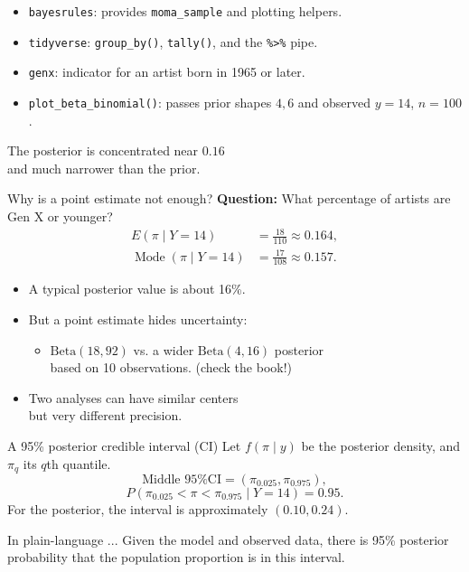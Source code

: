 \documentclass[aspectratio=43]{beamer}
\begin{document}
\begin{frame}{}
\begin{itemize}
\item \texttt{bayesrules}: provides \texttt{moma\_sample} and plotting helpers.
\item \texttt{tidyverse}: \texttt{group\_by()}, \texttt{tally()}, and the \texttt{\%>\%} pipe.
\item \texttt{genx}: indicator for an artist born in 1965 or later.
\item \texttt{plot\_beta\_binomial()}: passes prior shapes $4,6$ and observed $y=14$, $n=100$.
\end{itemize}
\begin{block}{}
The posterior is concentrated near $0.16$\\and much narrower than the prior.
\end{block}
\end{frame}

\begin{frame}{Why is a point estimate not enough?}
\textbf{Question:} What percentage of artists are Gen X or younger?
\[
\begin{aligned}
E(\pi\mid Y=14)&=\frac{18}{110}\approx0.164,\\
\operatorname{Mode}(\pi\mid Y=14)&=\frac{17}{108}\approx0.157.
\end{aligned}
\]
\begin{itemize}
\item A typical posterior value is about 16\%.
\item But a point estimate hides uncertainty:
\begin{itemize}
\item $\mathrm{Beta}(18,92)$ vs. a wider $\mathrm{Beta}(4,16)$ posterior\\based on 10 observations. (check the book!)
\end{itemize}
\item Two analyses can have similar centers\\but very different precision.
\end{itemize}
\end{frame}

\begin{frame}{A 95\% posterior credible interval (CI)}
Let $f(\pi\mid y)$ be the posterior density, and $\pi_q$ its $q$th quantile.
\[
\text{Middle 95\% CI}=(\pi_{0.025},\pi_{0.975}),
\]
\[
P(\pi_{0.025}<\pi<\pi_{0.975}\mid Y=14)=0.95.
\]
For the posterior, the interval is approximately $(0.10,0.24)$.
\begin{block}{In plain-language ...}
Given the model and observed data, there is 95\% posterior probability that the population proportion is in this interval.
\end{block}
\end{frame}
\end{document}
